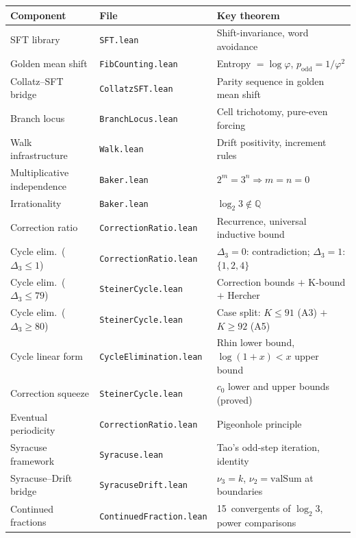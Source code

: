 \documentclass[manuscript]{aomart}
\newcommand{\Q}{\mathbb{Q}}
\theoremstyle{plain}
\theoremstyle{definition}
\theoremstyle{remark}
\numberwithin{equation}{section}
\begin{document}
\begin{center}
\renewcommand{\arraystretch}{1.3}
\begin{tabular}{lll}
  \toprule
  \textbf{Component} & \textbf{File} & \textbf{Key theorem} \\
  \midrule
  SFT library & \texttt{SFT.lean} &
    Shift-invariance, word avoidance \\
  Golden mean shift & \texttt{FibCounting.lean} &
    Entropy $= \log\varphi$, $p_{\mathrm{odd}} = 1/\varphi^2$ \\
  Collatz--SFT bridge & \texttt{CollatzSFT.lean} &
    Parity sequence in golden mean shift \\
  Branch locus & \texttt{BranchLocus.lean} &
    Cell trichotomy, pure-even forcing \\
  Walk infrastructure & \texttt{Walk.lean} &
    Drift positivity, increment rules \\
  Multiplicative independence & \texttt{Baker.lean} &
    $2^m = 3^n \Rightarrow m = n = 0$ \\
  Irrationality & \texttt{Baker.lean} &
    $\log_2 3 \notin \Q$ \\
  Correction ratio & \texttt{CorrectionRatio.lean} &
    Recurrence, universal inductive bound \\
  Cycle elim.\ ($\Delta_3 \le 1$) & \texttt{CorrectionRatio.lean} &
    $\Delta_3 = 0$: contradiction; $\Delta_3 = 1$: $\{1,2,4\}$ \\
  Cycle elim.\ ($\Delta_3 \le 79$) & \texttt{SteinerCycle.lean} &
    Correction bounds $+$ K-bound $+$ Hercher \\
  Cycle elim.\ ($\Delta_3 \ge 80$) & \texttt{SteinerCycle.lean} &
    Case split: $K \le 91$ (A3) $+$ $K \ge 92$ (A5) \\
  Cycle linear form & \texttt{CycleElimination.lean} &
    Rhin lower bound, $\log(1{+}x) < x$ upper bound \\
  Correction squeeze & \texttt{SteinerCycle.lean} &
    $c_0$ lower and upper bounds (proved) \\
  Eventual periodicity & \texttt{CorrectionRatio.lean} &
    Pigeonhole principle \\
  Syracuse framework & \texttt{Syracuse.lean} &
    Tao's odd-step iteration, identity \\
  Syracuse--Drift bridge & \texttt{SyracuseDrift.lean} &
    $\nu_3 = k$, $\nu_2 = \mathrm{valSum}$ at boundaries \\
  Continued fractions & \texttt{ContinuedFraction.lean} &
    15~convergents of $\log_2 3$, power comparisons \\

\end{tabular}
\end{center}
\end{document}
